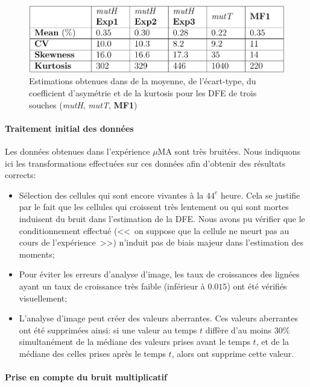 \documentclass[12pt]{article}
\begin{document}
\begin{figure}[h]
  \begin{center}
    \includegraphics[scale=0.3]{img/supmat_moments.png}
  \end{center}
  \caption{\label{moments}Estimations obtenues dans \cite{rob} de la moyenne, de l'écart-type, du coefficient d'asymétrie et de la kurtosis pour les DFE de trois souches (\emph{mutH}, \emph{mutT}, \textbf{MF1})}
\end{figure}



\paragraph{Traitement initial des données}

Les données obtenues dans l'expérience $\mu$MA sont très bruitées. Nous indiquons ici les transformations effectuées sur ces données afin d'obtenir des résultats corrects:
\begin{itemize}
\item Sélection des cellules qui sont encore vivantes à la $44^e$ heure. Cela se justifie par le fait que les cellules qui croissent très lentement ou qui sont mortes induisent du bruit dans l'estimation de la DFE. Nous avons pu vérifier que le conditionnement effectué (<<~on suppose que la cellule ne meurt pas au cours de l'expérience~>>) n'induit pas de biais majeur dans l'estimation des moments;
\item Pour éviter les erreurs d'analyse d'image, les taux de croissances des lignées ayant un taux de croissance très faible (inférieur à $0.015$) ont été vérifiés visuellement;
\item L'analyse d'image peut créer des valeurs aberrantes. Ces valeurs aberrantes ont été supprimées ainsi: si une valeur au temps $t$ diffère d'au moins $30\%$ simultanément de la médiane des valeurs prises avant le temps $t$, et de la médiane des celles prises après le temps $t$, alors ont supprime cette valeur.
\end{itemize}


\paragraph{Prise en compte du bruit multiplicatif}
\end{document}
